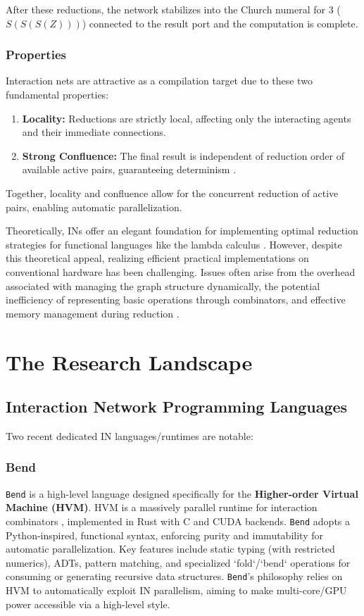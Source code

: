 After these reductions, the network stabilizes into the Church numeral for 3 ($S(S(S(Z)))$) connected to the result port and the computation is complete.

\subsubsection{Properties}

Interaction nets are attractive as a compilation target due to these two fundamental properties:
\begin{enumerate}
    \item \textbf{Locality:} Reductions are strictly local, affecting only the interacting agents and their immediate connections.
    \item \textbf{Strong Confluence:} The final result is independent of reduction order of available active pairs, guaranteeing determinism \cite{mazza}.
\end{enumerate}

Together, locality and confluence allow for the concurrent reduction of active pairs, enabling automatic parallelization.


Theoretically, INs offer an elegant foundation for implementing optimal reduction strategies for functional languages like the lambda calculus \cite{mazza}. However, despite this theoretical appeal, realizing efficient practical implementations on conventional hardware has been challenging. Issues often arise from the overhead associated with managing the graph structure dynamically, the potential inefficiency of representing basic operations through combinators, and effective memory management during reduction \cite{Pinto2014InteractionNetsReview}.


\section{The Research Landscape}
\subsection{Interaction Network Programming Languages}

Two recent dedicated IN languages/runtimes are notable:

\subsubsection{Bend}

\texttt{Bend} \cite{BendGithub} is a high-level language designed specifically for the \textbf{Higher-order Virtual Machine (HVM)}. HVM is a massively parallel runtime for interaction combinators \cite{Lafont1995InteractionCombinators}, implemented in Rust with C and CUDA backends. \texttt{Bend} adopts a Python-inspired, functional syntax, enforcing purity and immutability for automatic parallelization. Key features include static typing (with restricted numerics), ADTs, pattern matching, and specialized `fold`/`bend` operations for consuming or generating recursive data structures. \texttt{Bend}'s philosophy relies on HVM to automatically exploit IN parallelism, aiming to make multi-core/GPU power accessible via a high-level style.

